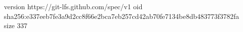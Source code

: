 version https://git-lfs.github.com/spec/v1
oid sha256:e337eeb7fe3a9d2cc8f66e2bca7eb257cd42ab70fe7134be8db483773f3782fa
size 337
